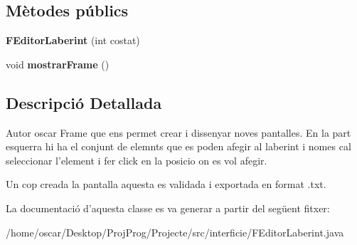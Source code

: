 \subsection*{Mètodes públics}
\begin{DoxyCompactItemize}
\item 
\hypertarget{classinterficie_1_1_f_editor_laberint_a1a43698ec96d8c97972115436bdfecea}{{\bfseries F\+Editor\+Laberint} (int costat)}\label{classinterficie_1_1_f_editor_laberint_a1a43698ec96d8c97972115436bdfecea}

\item 
\hypertarget{classinterficie_1_1_f_editor_laberint_a086984e576ea2a896cd286d6b5a0b2b7}{void {\bfseries mostrar\+Frame} ()}\label{classinterficie_1_1_f_editor_laberint_a086984e576ea2a896cd286d6b5a0b2b7}

\end{DoxyCompactItemize}


\subsection{Descripció Detallada}
\begin{DoxyAuthor}{Autor}
oscar Frame que ens permet crear i dissenyar noves pantalles. En la part esquerra hi ha el conjunt de elemnts que es poden afegir al laberint i nomes cal seleccionar l'element i fer click en la posicio on es vol afegir.
\end{DoxyAuthor}
Un cop creada la pantalla aquesta es validada i exportada en format .txt. 

La documentació d'aquesta classe es va generar a partir del següent fitxer\+:\begin{DoxyCompactItemize}
\item 
/home/oscar/\+Desktop/\+Proj\+Prog/\+Projecte/src/interficie/F\+Editor\+Laberint.\+java\end{DoxyCompactItemize}

